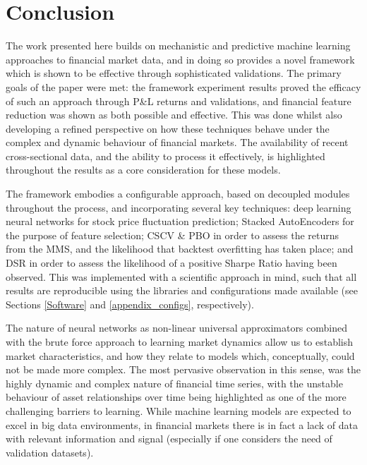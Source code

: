\documentclass[a4paper,11pt,oneside]{article}
\theoremstyle{plain}
\theoremstyle{definition}
\begin{document}
	
	
	\newpage
	\section{Conclusion}\label{Conclusion}
	
	The work presented here builds on mechanistic and predictive machine learning approaches to financial market data, and in doing so provides a novel framework which is shown to be effective through sophisticated validations. The primary goals of the paper were met: the framework experiment results proved the efficacy of such an approach through P\&L returns and validations, and financial feature reduction was shown as both possible and effective. This was done whilst also developing a refined perspective on how these techniques behave under the complex and dynamic behaviour of financial markets. The availability of recent cross-sectional data, and the ability to process it effectively, is highlighted throughout the results as a core consideration for these models. \newline
	
	The framework embodies a configurable approach, based on decoupled modules throughout the process, and incorporating several key techniques: deep learning neural networks for stock price fluctuation prediction; Stacked AutoEncoders for the purpose of feature selection; CSCV \& PBO in order to assess the returns from the MMS, and the likelihood that backtest overfitting has taken place; and DSR in order to assess the likelihood of a positive Sharpe Ratio having been observed. This was implemented with a scientific approach in mind, such that all results are reproducible using the libraries and configurations made available (see Sections \ref{Software} and \ref{appendix_configs}, respectively). \newline 
	
	The nature of neural networks as non-linear universal approximators combined with the brute force approach to learning market dynamics allow us to establish market characteristics, and how they relate to models which, conceptually, could not be made more complex. The most pervasive observation in this sense, was the highly dynamic and complex nature of financial time series, with the unstable behaviour of asset relationships over time being highlighted as one of the more challenging barriers to learning. While machine learning models are expected to excel in big data environments, in financial markets there is in fact a lack of data with relevant information and signal (especially if one considers the need of validation datasets). \newline
	
\end{document}
